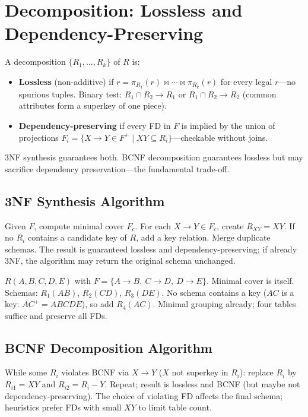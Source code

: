 \section{Decomposition: Lossless and Dependency-Preserving}
\label{sec:decomp}

A decomposition $\{R_1,\dots,R_k\}$ of $R$ is:

\begin{itemize}
    \item \textbf{Lossless} (non-additive) if $r = \pi_{R_1}(r)\bowtie\cdots\bowtie\pi_{R_k}(r)$ for every legal $r$---no spurious tuples. Binary test: $R_1\cap R_2\to R_1$ or $R_1\cap R_2\to R_2$ (common attributes form a superkey of one piece).
    \item \textbf{Dependency-preserving} if every FD in $F$ is implied by the union of projections $F_i=\{X\to Y\in F^+\mid XY\subseteq R_i\}$---checkable without joins.
\end{itemize}

3NF synthesis guarantees both. BCNF decomposition guarantees lossless but may sacrifice dependency preservation---the fundamental trade-off.

\subsection{3NF Synthesis Algorithm}

Given $F$, compute minimal cover $F_c$. For each $X\to Y\in F_c$, create $R_{X Y}=XY$. If no $R_i$ contains a candidate key of $R$, add a key relation. Merge duplicate schemas. The result is guaranteed lossless and dependency-preserving; if already 3NF, the algorithm may return the original schema unchanged.

\begin{example}
$R(A,B,C,D,E)$ with $F=\{A\to B,\ C\to D,\ D\to E\}$. Minimal cover is itself. Schemas: $R_1(AB)$, $R_2(CD)$, $R_3(DE)$. No schema contains a key ($AC$ is a key: $AC^+=ABCDE$), so add $R_4(AC)$. Minimal grouping already; four tables suffice and preserve all FDs.
\end{example}

\subsection{BCNF Decomposition Algorithm}

While some $R_i$ violates BCNF via $X\to Y$ ($X$ not superkey in $R_i$): replace $R_i$ by $R_{i1}=XY$ and $R_{i2}=R_i-Y$. Repeat; result is lossless and BCNF (but maybe not dependency-preserving). The choice of violating FD affects the final schema; heuristics prefer FDs with small $XY$ to limit table count.

